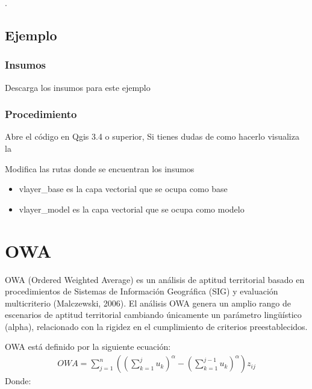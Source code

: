 \documentclass[letterpaper,10pt,spanish]{sphinxmanual}
\begin{document}
.


\subsection{Ejemplo}
\label{\detokenize{leesallee:ejemplo}}

\subsubsection{Insumos}
\label{\detokenize{leesallee:insumos}}
Descarga los insumos para este ejemplo 


\subsubsection{Procedimiento}
\label{\detokenize{leesallee:procedimiento}}
Abre el código  en Qgis 3.4 o superior,
Si tienes dudas de como hacerlo visualiza la 

Modifica las rutas donde se encuentran los insumos
\begin{itemize}
\item {} 
vlayer\_base es la capa vectorial que se ocupa como base

\item {} 
vlayer\_model es la capa vectorial que se ocupa como modelo

\end{itemize}

\noindent{}


\section{OWA}
\label{\detokenize{owa:owa}}\label{\detokenize{owa::doc}}
OWA (Ordered Weighted Average) es un análisis de aptitud territorial basado en procedimientos de
Sistemas de Información Geográfica (SIG) y evaluación multicriterio (Malczewski, 2006).
El análisis OWA genera un amplio rango de escenarios de aptitud territorial cambiando únicamente un
parámetro lingüístico (alpha), relacionado con la rigidez en el cumplimiento de criterios preestablecidos.

OWA está definido por la siguiente ecuación:
\begin{equation*}
\begin{split}OWA=\sum_{j=1}^{n}\left (\left( \sum_{k=1}^{j}u_{k}\right )^{\alpha} - \left ( \sum_{k=1}^{j-1}u_{k}\right )^{\alpha} \right )z_{ij}\end{split}
\end{equation*}
Donde:
\end{document}

